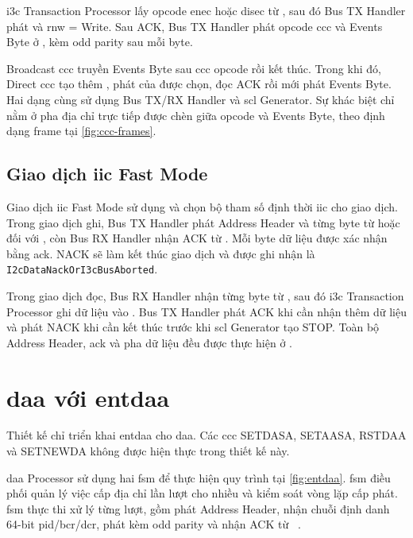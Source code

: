 \gls{i3c} Transaction Processor lấy opcode \gls{enec} hoặc \gls{disec} từ \CommandDescriptor{}, sau đó Bus TX Handler phát \IThreeCBroadcastAddress{} và \gls{rnw} = Write. Sau ACK, Bus TX Handler phát opcode \gls{ccc} và Events Byte ở \PushPull{}, kèm \TBit{} odd parity sau mỗi byte.

Broadcast \gls{ccc} truyền Events Byte sau \gls{ccc} opcode rồi kết thúc. Trong khi đó, Direct \gls{ccc} tạo thêm \RepeatedSTART{}, phát \DynamicAddress{} của \Target{} được chọn, đọc ACK rồi mới phát Events Byte. Hai dạng cùng sử dụng Bus TX/RX Handler và \gls{scl} Generator. Sự khác biệt chỉ nằm ở pha địa chỉ trực tiếp được chèn giữa opcode và Events Byte, theo định dạng frame tại \cref{fig:ccc-frames}.

\subsection{Giao dịch \texorpdfstring{\gls{iic}}{I2C} Fast Mode}

Giao dịch \gls{iic} Fast Mode sử dụng \StaticAddress{} và chọn bộ tham số định thời \gls{iic} cho giao dịch. Trong giao dịch ghi, Bus TX Handler phát Address Header và từng byte từ \TxFifo{} hoặc \CommandDescriptor{} đối với \ImmediateDataTransfer{}, còn Bus RX Handler nhận ACK từ \Target{}. Mỗi byte dữ liệu được \Target{} xác nhận bằng \gls{ack}. \Target{} NACK sẽ làm kết thúc giao dịch và được ghi nhận là \texttt{I2cDataNackOr\allowbreak I3cBusAborted}.

Trong giao dịch đọc, Bus RX Handler nhận từng byte từ \Target{}, sau đó \gls{i3c} Transaction Processor ghi dữ liệu vào \RxFifo{}. Bus TX Handler phát ACK khi cần nhận thêm dữ liệu và phát NACK khi cần kết thúc trước khi \gls{scl} Generator tạo STOP. Toàn bộ Address Header, \gls{ack} và pha dữ liệu đều được thực hiện ở \OpenDrain{}.

\section{\texorpdfstring{\acrshort{daa}}{DAA} với \texorpdfstring{\gls{entdaa}}{ENTDAA}}
\label{sec:rtl-entdaa}

Thiết kế chỉ triển khai \gls{entdaa} cho \acrshort{daa}. Các \gls{ccc} SETDASA, SETAASA, RSTDAA và SETNEWDA
không được hiện thực trong thiết kế này.

\Acrshort{daa} Processor sử dụng hai \gls{fsm} để thực hiện quy trình tại
\cref{fig:entdaa}. \gls{fsm} điều phối quản lý việc cấp địa chỉ lần lượt cho nhiều \Target{} và kiểm soát
vòng lặp cấp phát. \gls{fsm} thực thi xử lý từng lượt, gồm phát Address Header, nhận chuỗi định danh
64-bit \gls{pid}/\gls{bcr}/\gls{dcr}, phát \DynamicAddress{} kèm odd parity và nhận ACK từ
\Target{}~\cite{mipi_i3c_basic}.

